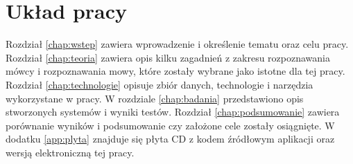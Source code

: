 \section{Układ pracy}\label{sec:uklad_pracy}

Rozdział \ref{chap:wstep} zawiera wprowadzenie i określenie tematu oraz celu
pracy. Rozdział \ref{chap:teoria} zawiera opis kilku zagadnień z zakresu
rozpoznawania mówcy i rozpoznawania mowy, które zostały wybrane jako
istotne dla tej pracy. Rozdział \ref{chap:technologie}
opisuje zbiór danych, technologie i narzędzia wykorzystane w pracy. W rozdziale
\ref{chap:badania} przedstawiono opis stworzonych systemów i wyniki testów. Rozdział
\ref{chap:podsumowanie} zawiera porównanie wyników i podsumowanie czy założone
cele zostały osiągnięte. W dodatku \ref{app:plyta} znajduje się płyta CD z
kodem źródłowym aplikacji oraz wersją elektroniczną tej pracy.

